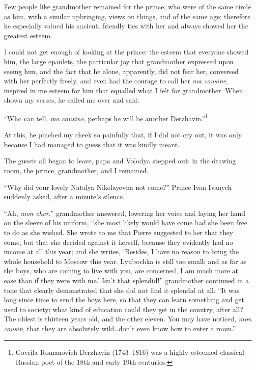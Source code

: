 Few people like grandmother remained for the prince, who were of the same circle as him, with a similar upbringing, views on things, and of the same age; therefore he especially valued his ancient, friendly ties with her and always showed her the greatest esteem.

I could not get enough of looking at the prince: the esteem that everyone showed him, the large epaulets, the particular joy that grandmother expressed upon seeing him, and the fact that he alone, apparently, did not fear her, conversed with her perfectly freely, and even had the courage to call her \textit{ma cousine}, inspired in me esteem for him that equalled what I felt for grandmother. When shown my verses, he called me over and said:

``Who can tell, \textit{ma cousine}, perhaps he will be another Derzhavin.''\footnote{Gavrila Romanovich Derzhavin (1743--1816) was a highly-esteemed classical Russian poet of the 18th and early 19th centuries.} %

At this, he pinched my cheek so painfully that, if I did not cry out, it was only because I had managed to guess that it was kindly meant.

The guests all began to leave, papa and Volodya stepped out: in the drawing room, the prince, grandmother, and I remained.

``Why did your lovely Natalya Nikolayevna not come?'' Prince Ivan Ivanych suddenly asked, after a minute's silence. %


``Ah, \textit{mon cher},'' grandmother answered, lowering her voice and laying her hand on the sleeve of his uniform, ``she most likely would have come had she been free to do as she wished. She wrote to me that Pierre suggested to her that they come, but that she decided against it herself, because they evidently had no income at all this year; and she writes, `Besides, I have no reason to bring the whole household to Moscow this year. Lyubochka is still too small; and as far as the boys, who are coming to live with you, are concerned, I am much more at ease than if they were with me.' Isn't that splendid!'' grandmother continued in a tone that clearly demonstrated that she did not find it splendid at all. ``It was long since time to send the boys here, so that they can learn something and get used to society; what kind of education could they get in the country, after all? The oldest is thirteen years old, and the other eleven. You may have noticed, \textit{mon cousin}, that they are absolutely wild\ldots{}don't even know how to enter a room.'' %

